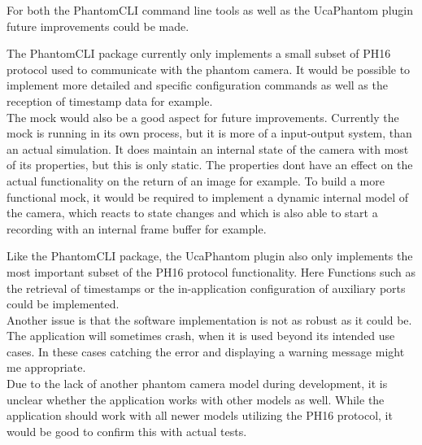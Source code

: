 For both the PhantomCLI command line tools as well as the UcaPhantom plugin future improvements could be made.\par 

The PhantomCLI package currently only implements a small subset of PH16 protocol used to communicate with the phantom camera. It would be possible to implement more detailed and specific configuration commands as well as the reception of timestamp data for example.\\
The mock would also be a good aspect for future improvements. Currently the mock is running in its own process, but it is more of a input-output system, than an actual simulation. It does maintain an internal state of the camera with most of its properties, but this is only static. The properties dont have an effect on the actual functionality on the return of an image for example. To build a more functional mock, it would be required to implement a dynamic internal model of the camera, which reacts to state changes and which is also able to start a recording with an internal frame buffer for example.\par 

Like the PhantomCLI package, the UcaPhantom plugin also only implements the most important subset of the PH16 protocol functionality. Here Functions such as the retrieval of timestamps or the in-application configuration of auxiliary ports could be implemented.\\
Another issue is that the software implementation is not as robust as it could be. The application will sometimes crash, when it is used beyond its intended use cases. In these cases catching the error and displaying a warning message might me appropriate.\\
Due to the lack of another phantom camera model during development, it is unclear whether the application works with other models as well. While the application should work with all newer models utilizing the PH16 protocol, it would be good to confirm this with actual tests.
